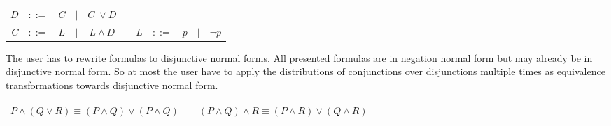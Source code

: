 \begin{center}
\begin{tabular}{rccccp{1cm}rcccl}
$D$	&$::=$ & $C$ 	&$|$ & $C \;\vee D$\\
$C$	&$::=$ & $L$ 	&$|$ & $L \wedge D$ &&
$L$	&$::=$ & $p$ 	&$|$ & $\neg p$
\end{tabular}
\end{center}

The user has to rewrite formulas to disjunctive normal forms. 
All presented formulas are in negation normal form 
but may already be in disjunctive normal form.
So at most the user have to apply the distributions of conjunctions over disjunctions 
multiple times as
equivalence transformations towards disjunctive normal form.


\begin{center}
\begin{tabular}{cp{5mm}c}
$P \wedge (Q \vee R) \equiv (P\wedge Q) \vee (P\wedge Q)$ 			& &
$(P \wedge Q) \wedge R \equiv (P\wedge R) \vee (Q\wedge R)$
\end{tabular}
\end{center}



%
%
%
%
%

